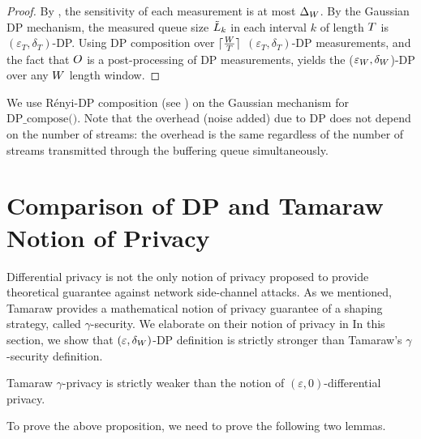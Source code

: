 \begin{proof}
    By , the sensitivity of each measurement is at most $\Delta_{W}$.
    By the Gaussian DP mechanism, the measured queue size $\tilde{L}_{k}$ in each interval $k$ of length $T$ is $(\varepsilon_{T}, \delta_{T})$-DP.
    Using DP composition over $\lceil \frac{W}{T} \rceil$ $(\varepsilon_{T}, \delta_{T})$-DP measurements, and the fact that $O$ is a post-processing of DP measurements, yields the ($\varepsilon_{W}, \delta_{W}$)-DP over any $W$ length window.
\end{proof}
We use R\'enyi-DP composition (see ) on the Gaussian mechanism for $\textrm{DP\_compose()}$.
Note that the overhead (\ie noise added) due to DP does not depend on the number of streams: the overhead is the same regardless of the number of streams transmitted through the buffering queue simultaneously.

\section{Comparison of DP and Tamaraw Notion of Privacy}
Differential privacy is not the only notion of privacy proposed to provide theoretical guarantee against network side-channel attacks.
As we mentioned, Tamaraw \cite{cai2014tamaraw} provides a
mathematical notion of privacy guarantee of a shaping strategy, called $\gamma$-security. 
We elaborate on their notion of privacy in 
In this section, we show that $(\varepsilon, \delta_{W})$-DP definition is strictly stronger than Tamaraw's $\gamma$-security definition.

\begin{proposition}
  Tamaraw $\gamma$-privacy is strictly weaker than the notion of $(\varepsilon, 0)$-differential privacy.
\end{proposition}
\noindent
To prove the above proposition, we need to prove the following two lemmas.

